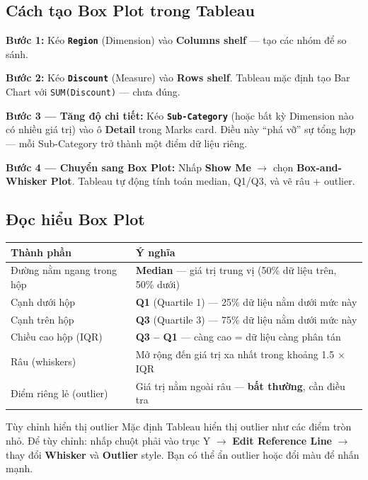 \documentclass[12pt]{article}
\begin{document}
\subsection{Cách tạo Box Plot trong Tableau}

\noindent \textbf{Bước 1:} Kéo \textbf{\texttt{Region}} (Dimension) vào \textbf{Columns shelf} --- tạo các nhóm để so sánh.

\noindent \textbf{Bước 2:} Kéo \textbf{\texttt{Discount}} (Measure) vào \textbf{Rows shelf}. Tableau mặc định tạo Bar Chart với \texttt{SUM(Discount)} --- chưa đúng.

\noindent \textbf{Bước 3 --- Tăng độ chi tiết:} Kéo \textbf{\texttt{Sub-Category}} (hoặc bất kỳ Dimension nào có nhiều giá trị) vào ô \textbf{Detail} trong Marks card. Điều này ``phá vỡ'' sự tổng hợp --- mỗi Sub-Category trở thành một điểm dữ liệu riêng.

\noindent \textbf{Bước 4 --- Chuyển sang Box Plot:} Nhấp \textbf{Show Me} $\rightarrow$ chọn \textbf{Box-and-Whisker Plot}. Tableau tự động tính toán median, Q1/Q3, và vẽ râu + outlier.

\subsection{Đọc hiểu Box Plot}

\begin{center}
\renewcommand{\arraystretch}{1.4}
\begin{tabularx}{\linewidth}{l X}
\toprule
\textbf{Thành phần} & \textbf{Ý nghĩa} \\
\midrule
Đường nằm ngang trong hộp & \textbf{Median} --- giá trị trung vị (50\% dữ liệu trên, 50\% dưới) \\
Cạnh dưới hộp & \textbf{Q1} (Quartile 1) --- 25\% dữ liệu nằm dưới mức này \\
Cạnh trên hộp & \textbf{Q3} (Quartile 3) --- 75\% dữ liệu nằm dưới mức này \\
Chiều cao hộp (IQR) & \textbf{Q3 -- Q1} --- càng cao = dữ liệu càng phân tán \\
Râu (whiskers) & Mở rộng đến giá trị xa nhất trong khoảng 1.5 $\times$ IQR \\
Điểm riêng lẻ (outlier) & Giá trị nằm ngoài râu --- \textbf{bất thường}, cần điều tra \\
\bottomrule
\end{tabularx}
\end{center}

\begin{tipbox}{Tùy chỉnh hiển thị outlier}
Mặc định Tableau hiển thị outlier như các điểm tròn nhỏ. Để tùy chỉnh: nhấp chuột phải vào trục Y $\rightarrow$ \textbf{Edit Reference Line} $\rightarrow$ thay đổi \textbf{Whisker} và \textbf{Outlier} style. Bạn có thể ẩn outlier hoặc đổi màu để nhấn mạnh.
\end{tipbox}
\end{document}
